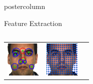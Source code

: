 \documentclass[final,hyperref={pdfpagelabels=false}]{beamer}
\begin{document}
\begin{frame}
\begin{columns}
\begin{column}{.33\textwidth}
\begin{beamercolorbox}[center,wd=\textwidth]{postercolumn}
\begin{minipage}[T]{.95\textwidth}
{\begin{block}{Feature Extraction}
\begin{columns}
\begin{column}{.44\textwidth}
\begin{tabularx}{\linewidth}{ZZZ}
                    \includegraphics[width=0.95\linewidth]{images/viola/surf-64x64-ip/m-012-1.pngsurf.png}
                    &
                    \includegraphics[width=0.95\linewidth]{images/viola/surf-64x64-4/m-012-1.pngsurf.png}
                    \\

\end{tabularx}
\end{column}
\end{columns}
\end{block}}
\end{minipage}
\end{beamercolorbox}
\end{column}
\end{columns}
\end{frame}
\end{document}
